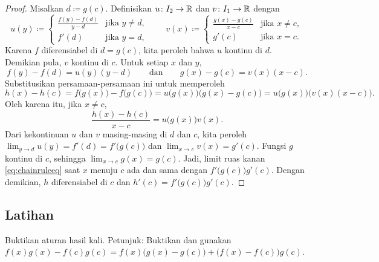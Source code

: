 \begin{proof}
Misalkan $d \coloneqq g(c)$.  Definisikan
$u \colon I_2 \to {\mathbb{R}}$ dan $v \colon I_1 \to {\mathbb{R}}$ dengan
\begin{equation*}
u(y) \coloneqq
\begin{cases}
 \frac{f(y) - f(d)}{y-d}  & \text{jika } y \neq d, \\
 f'(d)                    & \text{jika } y = d,
\end{cases}
\qquad
v(x) \coloneqq
\begin{cases}
 \frac{g(x) - g(c)}{x-c} & \text{jika } x \neq c, \\
 g'(c)                   & \text{jika } x = c.
\end{cases}
\end{equation*}
Karena $f$ diferensiabel di $d = g(c)$, kita peroleh bahwa
$u$ kontinu di $d$.  Demikian pula, $v$ kontinu di $c$.
Untuk setiap $x$ dan $y$,
\begin{equation*}
f(y)-f(d) = u(y) (y-d)
\qquad \text{dan} \qquad
g(x)-g(c) = v(x) (x-c) .
\end{equation*}
Substitusikan persamaan-persamaan ini untuk memperoleh
\begin{equation*}
h(x)-h(c)
=
f\bigl(g(x)\bigr)-f\bigl(g(c)\bigr)
=
u\bigl( g(x) \bigr) \bigl(g(x)-g(c)\bigr)
=
u\bigl( g(x) \bigr) \bigl(v(x) (x-c)\bigr) .
\end{equation*}
Oleh karena itu, jika $x \neq c$,
\begin{equation} \label{eq:chainruleeq}
\frac{h(x)-h(c)}{x-c}
=
u\bigl( g(x) \bigr) v(x) .
\end{equation}
Dari kekontinuan $u$ dan $v$ masing-masing di $d$ dan $c$, kita peroleh
$\lim_{y \to d} u(y)
= f'(d) = f'\bigl(g(c)\bigr)$ dan
$\lim_{x \to c} v(x) = g'(c)$.
Fungsi $g$ kontinu di $c$, sehingga $\lim_{x \to c} g(x) = g(c)$.
Jadi, limit
ruas kanan \eqref{eq:chainruleeq}
saat $x$ menuju $c$
ada dan sama dengan $f'\bigl(g(c)\bigr) g'(c)$.  Dengan demikian, $h$
diferensiabel di $c$ dan $h'(c) = f'\bigl(g(c)\bigr)g'(c)$.
\end{proof}

\subsection{Latihan}

\begin{exercise}
Buktikan aturan hasil kali.
Petunjuk: Buktikan dan gunakan
$f(x) g(x) - f(c) g(c) = f(x)\bigl( g(x) - g(c) \bigr) + \bigl( f(x) -
f(c) \bigr) g(c)$.
\end{exercise}


